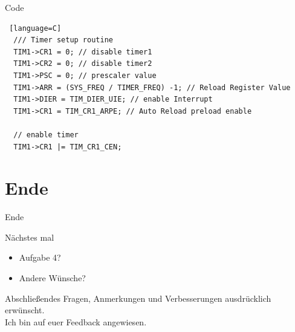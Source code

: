   \begin{frame}[fragile]{Code}
    \begin{lstlisting} [language=C]
  /// Timer setup routine
  TIM1->CR1 = 0; // disable timer1
  TIM1->CR2 = 0; // disable timer2
  TIM1->PSC = 0; // prescaler value
  TIM1->ARR = (SYS_FREQ / TIMER_FREQ) -1; // Reload Register Value
  TIM1->DIER = TIM_DIER_UIE; // enable Interrupt
  TIM1->CR1 = TIM_CR1_ARPE; // Auto Reload preload enable

  // enable timer
  TIM1->CR1 |= TIM_CR1_CEN;
    \end{lstlisting}
  \end{frame}


  \section{Ende}
  \begin{frame} {Ende}
    \begin{block} {Nächstes mal}
      \begin{itemize}
        \item Aufgabe 4?
        \item Andere Wünsche?
      \end{itemize}
    \end{block}
    \begin{exampleblock}{Abschließendes}
      Fragen, Anmerkungen und Verbesserungen ausdrücklich erwünscht.\\
      Ich bin auf euer Feedback angewiesen.
    \end{exampleblock}
  \end{frame}
